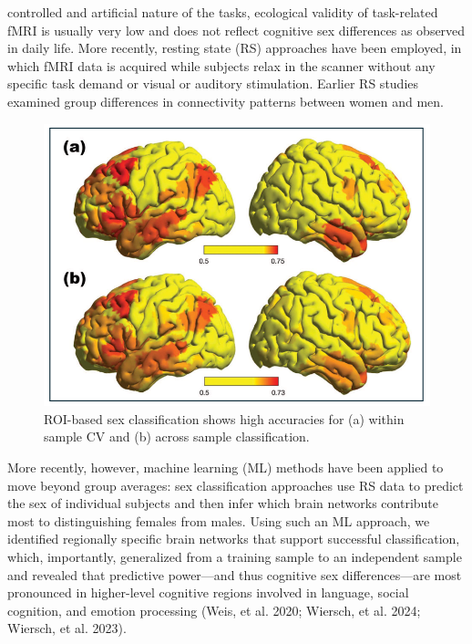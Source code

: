 \documentclass[11pt,a4paper]{article}
\begin{document}
controlled and artificial nature of the tasks, ecological validity of task-related fMRI is usually 
very low and does not reflect cognitive sex differences as observed in daily life. More recently, 
resting state (RS) approaches have been employed, in which fMRI data is acquired while subjects relax 
in the scanner without any specific task demand or visual or auditory stimulation. Earlier
RS studies examined group differences in connectivity patterns between women and men. 
\begin{figure} %
  \vspace{-10pt} %
  \includegraphics[width=\linewidth]{sex_classification.png}
  \caption{ROI-based sex classification shows high accuracies for (a) within sample CV and (b) across sample classification.}
  \label{fig:sexclass}
\end{figure}
More recently, however, machine learning (ML) methods have been applied to move beyond group averages: sex classification approaches 
use RS data to predict the sex of individual subjects and then infer which brain networks contribute most to 
distinguishing females from males. Using such an ML approach, we identified regionally specific brain networks 
that support successful classification, which, importantly, generalized from a training sample to an independent 
sample and revealed that predictive power—and thus cognitive sex differences—are most pronounced in higher-level 
cognitive regions involved in language, social cognition, and emotion processing 
(Weis, et al. 2020; Wiersch, et al. 2024; Wiersch, et al. 2023).
\end{document}
